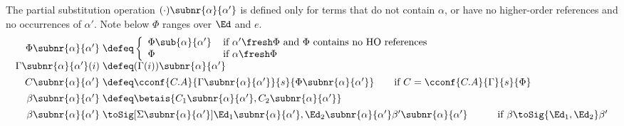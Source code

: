 \begin{definition}
  The partial substitution operation $(\cdot)\subnr{\alpha}{\alpha'}$ is defined only for terms that do not contain $\alpha$, or have no higher-order references and no occurrences of $\alpha'$. Note below $\Phi$ ranges over $\Ed$ and $e$.
  \begin{gather*}
  \begin{array}{@{}r@{\;}l@{}}
    \Phi\subnr{\alpha}{\alpha'}      & \defeq \left\{
      \begin{array}{l@{\quad\,}l}
        \Phi\sub{\alpha}{\alpha'} & \text{if $\alpha'\fresh\Phi$ and $\Phi$ contains no HO references} \\
        \Phi                      & \text{if $\alpha\fresh\Phi$}
      \end{array}
      \right. 
   \\[1ex]
   \Gamma\subnr{\alpha}{\alpha'}(i) & \defeq 
     (\Gamma(i))\subnr{\alpha}{\alpha'} 
   \\[1ex]
   C\subnr{\alpha}{\alpha'} &\defeq %
\cconf{C.A}{\Gamma\subnr{\alpha}{\alpha'}}{s}{\Phi\subnr{\alpha}{\alpha'}}
 \qquad\text{if }
C = \cconf{C.A}{\Gamma}{s}{\Phi}
   \\[1ex]
   \beta\subnr{\alpha}{\alpha'} & \defeq 
      \betais{C_1\subnr{\alpha}{\alpha'}, C_2\subnr{\alpha}{\alpha'}}
   \\[1ex]
    \beta\subnr{\alpha}{\alpha'} &\toSig[\Sigma\subnr{\alpha}{\alpha'}]{\Ed_1\subnr{\alpha}{\alpha'}, \Ed_2\subnr{\alpha}{\alpha'}} \beta'\subnr{\alpha}{\alpha'} 
    \qquad\quad\text{if }
    \beta\toSig{\Ed_1, \Ed_2}\beta'
  \end{array}
  \end{gather*}
\end{definition}


